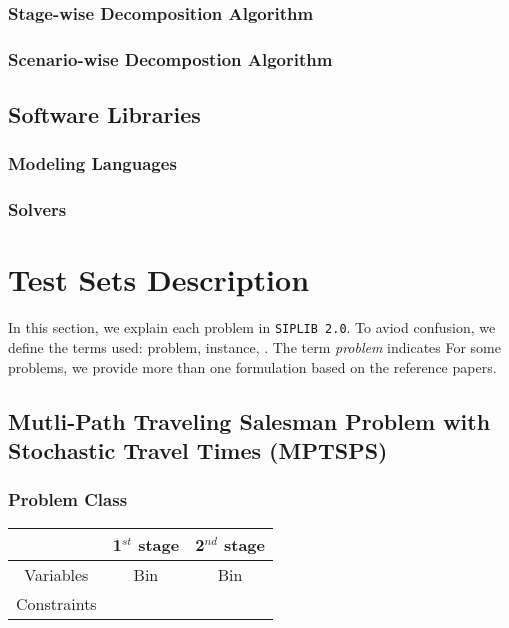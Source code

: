 \subsubsection{Stage-wise Decomposition Algorithm}
\subsubsection{Scenario-wise Decompostion Algorithm}

\subsection{Software Libraries}
\subsubsection{Modeling Languages}
\subsubsection{Solvers}

\section{Test Sets Description}

In this section, we explain each problem in \texttt{SIPLIB 2.0}. To aviod confusion, we define the terms used: problem, instance, . The term \textit{problem} indicates  For some problems, we provide more than one formulation based on the reference papers. 
\subsection{Mutli-Path Traveling Salesman Problem with Stochastic Travel Times (MPTSPS)}
\subsubsection{Problem Class}
\begin{table}[H]
	\centering
	\label{mptsps-class}
	\begin{tabular}{|c|c|c|}
		\hline
		& 1$^{st}$ stage & 2$^{nd}$ stage \\ \hline
		Variables   & Bin & Bin               \\ \hline
		Constraints &                &                \\ \hline
	\end{tabular}
\end{table}
